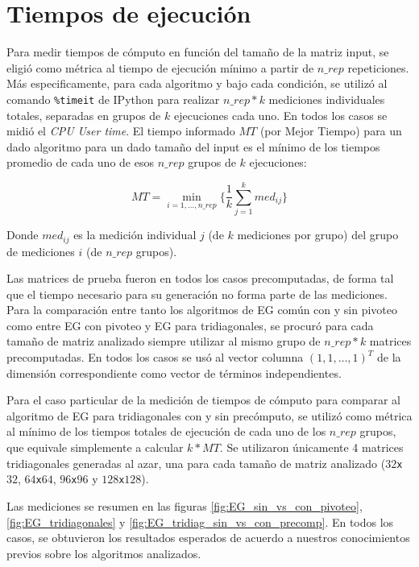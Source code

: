 \section{Tiempos de ejecuci\'on}
\label{tiempos}

Para medir tiempos de cómputo en función del tamaño de la matriz input, se eligió como métrica al tiempo de ejecución mínimo a partir de $n\_rep$ repeticiones. Más especificamente, para cada algoritmo y bajo cada condición, se utilizó al comando \texttt{\%timeit} de IPython\cite{timeit} para realizar $n\_rep*k$ mediciones individuales totales, separadas en grupos de $k$ ejecuciones cada uno. En todos los casos se midió el \textit{CPU User time}\cite{patterson}. El tiempo informado $MT$ (por Mejor Tiempo) para un dado algoritmo para un dado tamaño del input es el mínimo de los tiempos promedio de cada uno de esos $n\_rep$ grupos de $k$ ejecuciones:

$$MT = \min\limits_{i = 1,...,n\_rep} {\{\frac{1}{k}\sum\limits_{j = 1}^{k}{med_{ij}}\}}$$

Donde $med_{ij}$ es la medición individual $j$ (de $k$ mediciones por grupo) del grupo de mediciones $i$ (de $n\_rep$ grupos).

Las matrices de prueba fueron en todos los casos precomputadas, de forma tal que el tiempo necesario para su generación no forma parte de las mediciones. Para la comparación entre tanto los algoritmos de EG común con y sin pivoteo como entre EG con pivoteo y EG para tridiagonales, se procuró para cada tamaño de matriz analizado siempre utilizar al mismo grupo de $n\_rep*k$ matrices precomputadas. En todos los casos se usó al vector columna $(1, 1, \hdots, 1)^T$ de la dimensión correspondiente como vector de términos independientes.

Para el caso particular de la medición de tiempos de cómputo para comparar al algoritmo de EG para tridiagonales con y sin precómputo, se utilizó como métrica al mínimo de los tiempos totales de ejecución de cada uno de los $n\_rep$ grupos, que equivale simplemente a calcular $k*MT$. Se utilizaron únicamente 4 matrices tridiagonales generadas al azar, una para cada tamaño de matriz analizado ($32$\texttt{x}$32$, $64$\texttt{x}$64$, $96$\texttt{x}$96$ y $128$\texttt{x}$128$).

Las mediciones se resumen en las figuras \ref{fig:EG_sin_vs_con_pivoteo}, \ref{fig:EG_tridiagonales} y \ref{fig:EG_tridiag_sin_vs_con_precomp}. En todos los casos, se obtuvieron los resultados esperados de acuerdo a nuestros conocimientos previos sobre los algoritmos analizados. 

